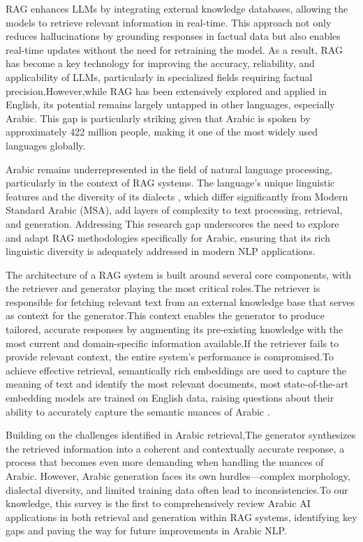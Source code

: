 \documentclass[runningheads]{llncs}
\begin{document}
RAG enhances LLMs by integrating external knowledge databases, allowing the models to retrieve relevant information in real-time. This approach not only reduces hallucinations by grounding responses in factual data but also enables real-time updates without the need for retraining the model. As a result, RAG has become a key technology for improving the accuracy, reliability, and applicability of LLMs, particularly in specialized fields requiring factual precision.However,while RAG has been extensively explored and applied in English\cite{fan2024}, its potential remains largely untapped in other languages, especially Arabic. This gap is particularly striking given that Arabic is spoken by approximately 422 million people, making it one of the most widely used languages globally. 

Arabic remains underrepresented in the field of natural language processing, particularly in the context of RAG systems. The language's unique linguistic features and the diversity of its dialects \cite{Darwish2021}, which differ significantly from Modern Standard Arabic (MSA), add layers of complexity to text processing, retrieval, and generation. Addressing This research gap underscores the need to explore and adapt RAG methodologies specifically for Arabic, ensuring that its rich linguistic diversity is adequately addressed in modern NLP applications.

The architecture of a RAG system is built around several core components, with the retriever and generator playing the most critical roles.The retriever is responsible for fetching relevant text from an external knowledge base that serves as context for the generator.This context enables the generator to produce tailored, accurate responses by augmenting its pre-existing knowledge with the most current and domain-specific information available.If the retriever fails to provide relevant context, the entire system’s performance is compromised.To achieve effective retrieval, semantically rich embeddings are used to capture the meaning of text and identify the most relevant documents,
most state-of-the-art embedding models are trained on English data, raising questions about their ability to accurately capture the semantic nuances of Arabic .

Building on the challenges identified in Arabic retrieval,The generator synthesizes the retrieved information into a coherent and contextually accurate response, a process that becomes even more demanding when handling the nuances of Arabic. However, Arabic generation faces its own hurdles—complex morphology, dialectal diversity, and limited training data often lead to inconsistencies.To our knowledge, this survey is the first to comprehensively review Arabic AI applications in both retrieval and generation within RAG systems, identifying key gaps and paving the way for future improvements in Arabic NLP.
\end{document}
